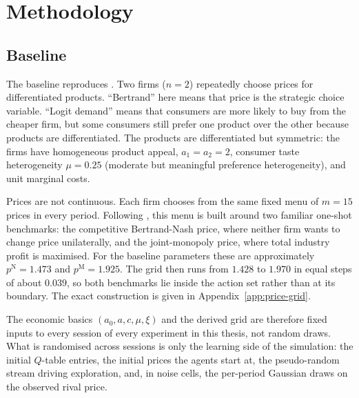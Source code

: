 \section{Methodology}
\label{sec:methodology}

\subsection{Baseline}
\label{sec:methodology-baseline}

The baseline reproduces \citet{calvano2020}. Two firms ($n=2$) repeatedly choose prices for differentiated products. ``Bertrand'' here means that price is the strategic choice variable. ``Logit demand'' means that consumers are more likely to buy from the cheaper firm, but some consumers still prefer one product over the other because products are differentiated. The products are differentiated but symmetric: the firms have homogeneous product appeal, $a_1=a_2=2$, consumer taste heterogeneity $\mu=0.25$ (moderate but meaningful preference heterogeneity), and unit marginal costs.

Prices are not continuous. Each firm chooses from the same fixed menu of $m=15$ prices in every period. Following \citet{calvano2020}, this menu is built around two familiar one-shot benchmarks: the competitive Bertrand-Nash price, where neither firm wants to change price unilaterally, and the joint-monopoly price, where total industry profit is maximised. For the baseline parameters these are approximately $p^{\mathrm{N}}=1.473$ and $p^{\mathrm{M}}=1.925$. The grid then runs from $1.428$ to $1.970$ in equal steps of about $0.039$, so both benchmarks lie inside the action set rather than at its boundary. The exact construction is given in Appendix~\ref{app:price-grid}.

The economic basics $(a_0,a,c,\mu,\xi)$ and the derived grid are therefore fixed inputs to every session of every experiment in this thesis, not random draws. What is randomised across sessions is only the learning side of the simulation: the initial $Q$-table entries, the initial prices the agents start at, the pseudo-random stream driving exploration, and, in noise cells, the per-period Gaussian draws on the observed rival price.


